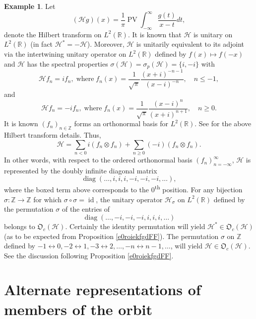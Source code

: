 \documentclass{dis}
\theoremstyle{plain}
\theoremstyle{definition}
\newtheorem{Example}[equation]{Example}
\def\R{\mathbb{R}}
\def\Z{\mathbb{Z}}
\renewcommand{\leq}{\leqslant}
\renewcommand{\geq}{\geqslant}
\newcommand{\0}{{\color{lightgray}0}}
\begin{document}
\begin{Example}\label{ldfgjdfjg888uuUU}
Let
 \begin{equation}\label{Hilberttransformmmm}
 (\mathscr{H} g)(x) = \frac{1}{\pi}  \operatorname{PV} \int_{-\infty}^{\infty} \frac{g(t)}{x - t} dt,
 \end{equation}
  denote the Hilbert transform on $L^2(\R)$. It is known that $\mathscr{H}$ is unitary on $L^2(\R)$ (in fact $\mathscr{H}^{*} = - \mathscr{H}$). 
Moreover, $\mathscr{H}$ is unitarily equivalent to its adjoint via the intertwining  unitary operator on $L^2(\R)$ defined by  $f(x) \mapsto f(-x)$ and  $\mathscr{H}$ has the spectral properties $\sigma(\mathscr{H}) = \sigma_{p}(\mathscr{H}) = \{i, -i\}$ with 
$$\mathscr{H} f_n = i f_n, \;  \mbox{where} \; 
f_n(x) = \frac{1}{\sqrt{\pi}} \frac{(x + i)^{-n - 1}}{(x - i)^{-n}}, \quad n \leq - 1,$$
and 
$$\mathscr{H} f_n = - i f_n, \; \mbox{where} \; 
f_{n}(x) = \frac{1}{\sqrt{\pi}} \frac{(x - i)^{n}}{(x + i)^{n + 1}}, \quad n \geq 0.$$
It is known  $(f_n)_{n \in \Z}$ forms an orthonormal basis for $L^2(\R)$.
See \cite[Ch. 12]{MR4545809} for the above Hilbert transform details. Thus,
\begin{equation}\label{diagonalizeH}
\mathscr{H} = \sum_{n < 0} i (f_n \otimes f_n) + \sum_{n \geq 0} (-i) (f_n \otimes f_n).
\end{equation}
In other words, with respect to the ordered  orthonormal basis $(f_{n})_{n = - \infty}^{\infty}$, $\mathscr{H}$ is represented by the doubly infinite diagonal matrix
$$\operatorname{diag}(\ldots, i, i, i, \boxed{-i}, -i, -i, \ldots),$$
where the boxed term above corresponds to the $0$\textsuperscript{th} position. 
For any bijection $\sigma: \Z \to \Z$ for which $\sigma \circ \sigma = \operatorname{id}$,  the unitary operator $\mathscr{H}_{\sigma}$ on $L^2(\R)$ defined by the permutation $\sigma$ of the entries of 
$$\operatorname{diag}(\ldots, -i, -i, -i, \boxed{i}, i, i, \ldots)$$
belongs to $\mathfrak{O}_c(\mathscr{H})$. Certainly the identity permutation will yield $\mathscr{H}^{*} \in \mathfrak{O}_c(\mathscr{H})$ (as to be expected from Proposition \ref{e0roiekfgdFF}). The permutation $\sigma$ on $\Z$ defined by $-1 \leftrightarrow 0, -2 \leftrightarrow 1, -3 \leftrightarrow 2, \ldots, -n  \leftrightarrow n - 1, \ldots$, will yield $\mathscr{H} \in \mathfrak{O}_c(\mathscr{H})$. See the discussion following Proposition \ref{e0roiekfgdFF}.
\end{Example}



\section{Alternate representations of members of the orbit}
\end{document}
